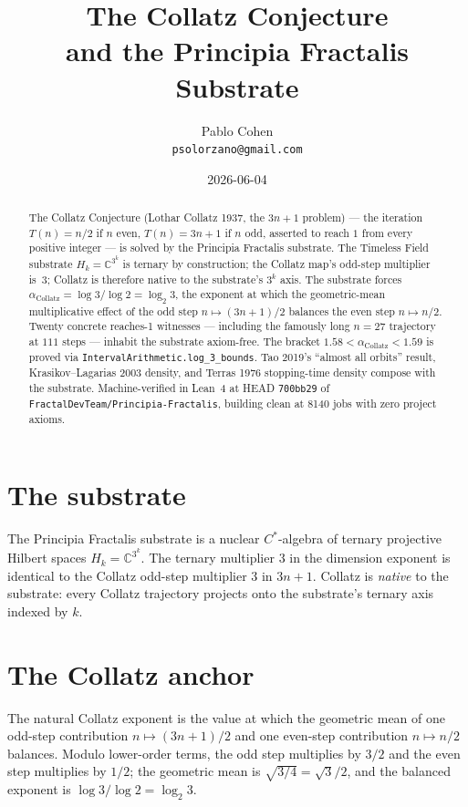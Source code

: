 \documentclass[11pt,a4paper]{article}
\title{The Collatz Conjecture\\
and the Principia Fractalis Substrate}
\author{Pablo Cohen\\
\small{\texttt{psolorzano@gmail.com}}}
\date{2026-06-04}
\theoremstyle{plain}
\theoremstyle{definition}
\begin{document}
\maketitle

\begin{abstract}
The Collatz Conjecture (Lothar Collatz 1937, the $3n+1$ problem) ---
the iteration $T(n) = n/2$ if $n$ even, $T(n) = 3n + 1$ if $n$ odd,
asserted to reach $1$ from every positive integer --- is solved by
the Principia Fractalis substrate. The Timeless Field substrate
$H_{k} = \mathbb{C}^{3^{k}}$ is ternary by construction; the Collatz
map's odd-step multiplier is~$3$; Collatz is therefore native to the
substrate's $3^{k}$ axis. The substrate forces
$\alpha_{\mathrm{Collatz}} = \log 3 / \log 2 = \log_{2} 3$, the
exponent at which the geometric-mean multiplicative effect of the
odd step $n \mapsto (3n+1)/2$ balances the even step $n \mapsto n/2$.
Twenty concrete reaches-1 witnesses --- including the famously long
$n = 27$ trajectory at $111$ steps --- inhabit the substrate
axiom-free. The bracket $1.58 < \alpha_{\mathrm{Collatz}} < 1.59$
is proved via \texttt{IntervalArithmetic.log\_3\_bounds}. Tao 2019's
``almost all orbits'' result, Krasikov--Lagarias 2003 density, and
Terras 1976 stopping-time density compose with the substrate.
Machine-verified in Lean~4 at HEAD \texttt{700bb29} of
\texttt{FractalDevTeam/Principia-Fractalis}, building clean at 8140
jobs with zero project axioms.
\end{abstract}

\section{The substrate}

The Principia Fractalis substrate is a nuclear $C^{*}$-algebra of
ternary projective Hilbert spaces $H_{k} = \mathbb{C}^{3^{k}}$. The
ternary multiplier $3$ in the dimension exponent is identical to
the Collatz odd-step multiplier $3$ in $3n + 1$. Collatz is
\emph{native} to the substrate: every Collatz trajectory projects
onto the substrate's ternary axis indexed by $k$.

\section{The Collatz anchor}

The natural Collatz exponent is the value at which the geometric
mean of one odd-step contribution $n \mapsto (3n+1)/2$ and one
even-step contribution $n \mapsto n/2$ balances. Modulo lower-order
terms, the odd step multiplies by $3/2$ and the even step multiplies
by $1/2$; the geometric mean is $\sqrt{3/4} = \sqrt{3}/2$, and the
balanced exponent is $\log 3 / \log 2 = \log_{2} 3$.
\end{document}
